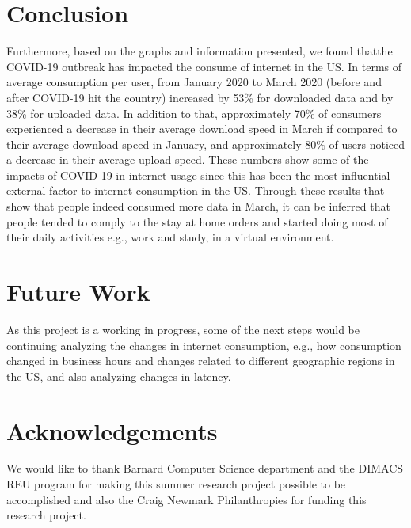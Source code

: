 \documentclass[conference,10pt]{IEEEtran}
\begin{document}
\section{Conclusion}
\label{sec:conclusion}




Furthermore, based on the graphs and information presented, we found thatthe COVID-19 outbreak has impacted the consume of internet in the US. In terms of average consumption per user, from January 2020 to March 2020 (before and after COVID-19 hit the country) increased by 53\% for downloaded data and by 38\% for uploaded data. In addition to that, approximately 70\% of consumers experienced a decrease in their average download speed in March if compared to their average download speed in January, and approximately 80\% of users noticed a decrease in their average upload speed. These numbers show some of the impacts of COVID-19 in internet usage since this has been the most influential external factor to internet consumption in the US. Through these results that show that people indeed consumed more data in March, it can be inferred that people tended to comply to the stay at home orders and started doing most of their daily activities e.g., work and study, in a virtual environment.

\section{Future Work}
\label{sec:future-work}

As this project is a working in progress, some of the next steps would be continuing analyzing the changes in internet consumption, e.g., how consumption changed in business hours and changes related to different geographic regions in the US, and also analyzing changes in latency.

\section{Acknowledgements}
\label{sec:acknowledgements}

We would like to thank Barnard Computer Science department and the DIMACS REU program for making this summer research project possible to be accomplished and also the Craig Newmark Philanthropies for funding this research project.



\end{document}
